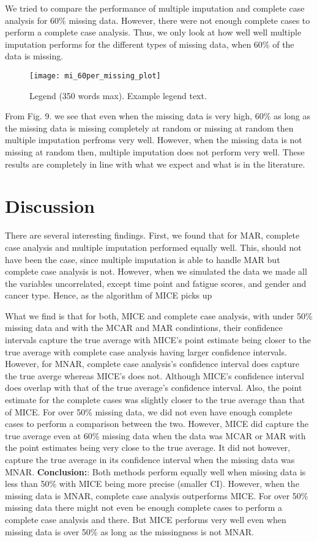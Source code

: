 \documentclass[fleqn,10pt]{wlscirep}\usepackage[]{graphicx}\usepackage[]{color}
\begin{document}
We tried to compare the performance of multiple imputation and complete case analysis for 60\% missing data. However, there were not enough complete cases to perform a complete case analysis. Thus, we only look at how well well multiple imputation performs for the different types of missing data, when 60\% of the data is missing.     

\begin{figure}[H]
\centering
\texttt{[image: mi\_60per\_missing\_plot]}
\caption{Legend (350 words max). Example legend text.}
\label{fig:mi_60per_missing_plot}
\end{figure}

From Fig. 9. we see that even when the missing data is very high, 60\% as long as the missing data is missing completely at random or missing at random then multiple imputation perfroms very well. However, when the missing data is not missing at random then, multiple imputation does not perform very well. These results are completely in line with what we expect and what is in the literature. 

\section{Discussion}

There are several interesting findings. First, we found that for MAR, complete case analysis and multiple imputation performed equally well. This, should not have been the case, since multiple imputation is able to handle MAR but complete case analysis is not. However, when we simulated the data we made all the variables uncorrelated, except time point and fatigue scores, and gender and cancer type. Hence, as the algorithm of MICE picks up 

What we find is that for both, MICE and complete case analysis, with under 50\% missing data and with the MCAR and MAR condintions, their confidence intervals capture the true average with MICE's point estimate being closer to the true average with complete case analysis having larger confidence intervals. However, for MNAR, complete case analysis's confidence interval does capture the true averge whereas MICE's does not. Although MICE's confidence interval does overlap with that of the true average's confidence interval. Also, the point estimate for the complete cases was slightly closer to the true average than that of MICE. For over 50\% missing data, we did not even have enough complete cases to perform a comparison between the two. However, MICE did capture the true average even at 60\% missing data when the data was MCAR or MAR with the point estimates being very close to the true average. It did not however, capture the true average in its confidence interval when the missing data was MNAR. \textbf{Conclusion:}: Both methods perform equally well when missing data is less than 50\% with MICE being more precise (smaller CI). However, when the missing data is MNAR, complete case analysis outperforms MICE. For over 50\% missing data there might not even be enough complete cases to perform a complete case analysis and there. But MICE performs very well even when missing data is over 50\% as long as the missingness is not MNAR. 
\end{document}
